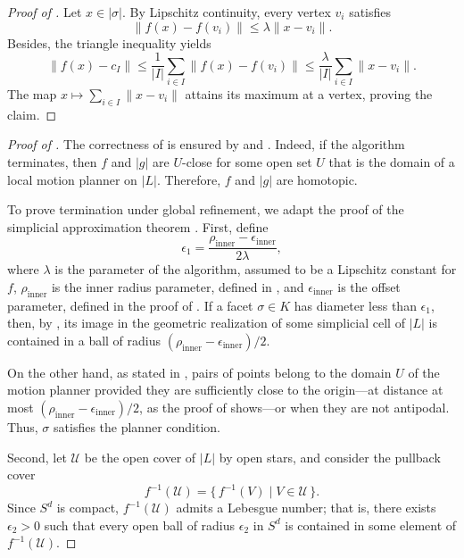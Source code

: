 \documentclass[a4paper,english,cleveref,autoref,thm-restate,nolineno]{socg-lipics-v2021}
\newcommand{\geomreal}[1] { |#1| } %
\begin{document}
\lipschitzdeformationsimplices*

\begin{proof}[Proof of ]
	\label{proof:lipschitz_deformation_simplices}
	Let $x\in\geomreal{\sigma}$.
	By Lipschitz continuity, every vertex $v_i$ satisfies
	\[
		\|f(x)-f(v_i)\|\leq \lambda	\|x-v_i\|.
	\]
	Besides, the triangle inequality yields
	\[
		\|f(x)-c_I\| \leq \frac{1}{|I|}\sum_{i\in I}\|f(x)-f(v_i)\| \leq \frac{\lambda}{|I|}\sum_{i\in I} \|x-v_i\|.
	\]
	The map $x\mapsto \sum_{i\in I} \|x-v_i\|$ attains its maximum at a vertex, proving the claim.
\end{proof}

\approximationroutine*

\begin{proof}[Proof of ]
	\label{proof:approximationroutine}
	The correctness of  is ensured by  and .
	Indeed, if the algorithm terminates, then $f$ and $\geomreal{g}$ are $U$-close for some open set $U$ that is the domain of a local motion planner on $\geomreal{L}$. Therefore, $f$ and $\geomreal{g}$ are homotopic.
	
	To prove termination under global refinement, we adapt the proof of the simplicial approximation theorem \cite[Theorem~2C.1]{hatcher_algebraic_2002}.
	First, define
	\[
	\epsilon_1=\frac{\rho_\mathrm{inner}-\epsilon_\mathrm{inner}}{2\lambda},
	\]
	where $\lambda$ is the parameter of the algorithm, assumed to be a Lipschitz constant for $f$, $\rho_\mathrm{inner}$ is the inner radius parameter, defined in , and $\epsilon_\mathrm{inner}$ is the offset parameter, defined in the proof of .
	If a facet $\sigma\in K$ has diameter less than $\epsilon_1$, then, by , its image in the geometric realization of some simplicial cell of $\geomreal{L}$ is contained in a ball of radius $(\rho_\mathrm{inner}-\epsilon_\mathrm{inner})/2$.

	On the other hand, as stated in , pairs of points belong to the domain $U$ of the motion planner provided they are sufficiently close to the origin---at distance at most $(\rho_\mathrm{inner}-\epsilon_\mathrm{inner})/2$, as the proof of  shows---or when they are not antipodal.
	Thus, $\sigma$ satisfies the planner condition.
	
	Second, let $\mathcal{U}$ be the open cover of $\geomreal{L}$ by open stars, and consider the pullback cover
	\[
	f^{-1}(\mathcal{U})=\{\,f^{-1}(V)\mid V\in\mathcal{U}\,\}.
	\]
	Since $S^d$ is compact, $f^{-1}(\mathcal{U})$ admits a Lebesgue number; that is, there exists $\epsilon_2>0$ such that every open ball of radius $\epsilon_2$ in $S^d$ is contained in some element of $f^{-1}(\mathcal{U})$.


\end{proof}
\end{document}
